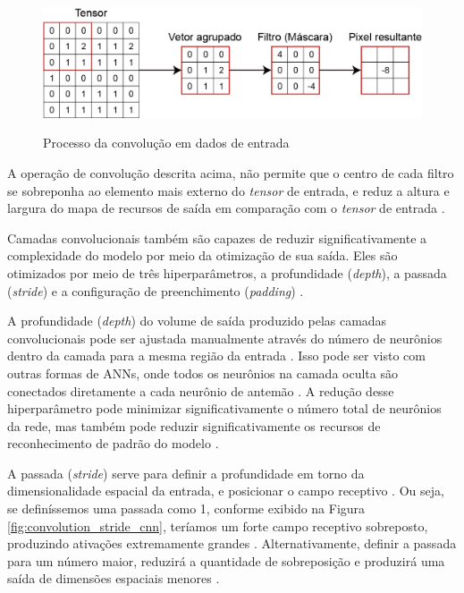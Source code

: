 \documentclass[
	12pt,				%
	oneside,			%
	a4paper,			%
	english,			%
	brazil				%
	]{abntex2ppgsi}
\begin{document}
\begin{figure}[H]
    \centering
    \caption{Processo da convolução em dados de entrada}
    \includegraphics[scale=.35]{imagens/conceitos_basicos/convolution_cnn.jpg}
    \label{fig:convolution_cnn}
\end{figure}

A operação de convolução descrita acima, não permite que o centro de cada filtro se sobreponha ao elemento mais externo do \textit{tensor} de entrada, e reduz a altura e largura do mapa de recursos de saída em comparação com o \textit{tensor} de entrada \cite{yamashita2018convolutional}.

Camadas convolucionais também são capazes de reduzir significativamente a complexidade do modelo por meio da otimização de sua saída. Eles são otimizados por meio de três hiperparâmetros, a profundidade (\textit{depth}), a passada (\textit{stride}) e a configuração de preenchimento (\textit{padding}) \cite{o2015introduction}. 

A profundidade (\textit{depth}) do volume de saída produzido pelas camadas convolucionais pode ser ajustada manualmente através do número de neurônios dentro da camada para a mesma região da entrada \cite{o2015introduction}. Isso pode ser visto com outras formas de ANNs, onde todos os neurônios na camada oculta são conectados diretamente a cada neurônio de antemão \cite{o2015introduction}. A redução desse hiperparâmetro pode minimizar significativamente o número total de neurônios da rede, mas também pode reduzir significativamente os recursos de reconhecimento de padrão do modelo \cite{o2015introduction}.

A passada (\textit{stride}) serve para definir a profundidade em torno da dimensionalidade espacial da entrada, e posicionar o campo receptivo \cite{o2015introduction}. Ou seja, se definíssemos uma passada como 1, conforme exibido na Figura \ref{fig:convolution_stride_cnn}, teríamos um forte campo receptivo sobreposto, produzindo ativações extremamente grandes \cite{o2015introduction}. Alternativamente, definir a passada para um número maior, reduzirá a quantidade de sobreposição e produzirá uma saída de dimensões espaciais menores \cite{o2015introduction}.
\end{document}
